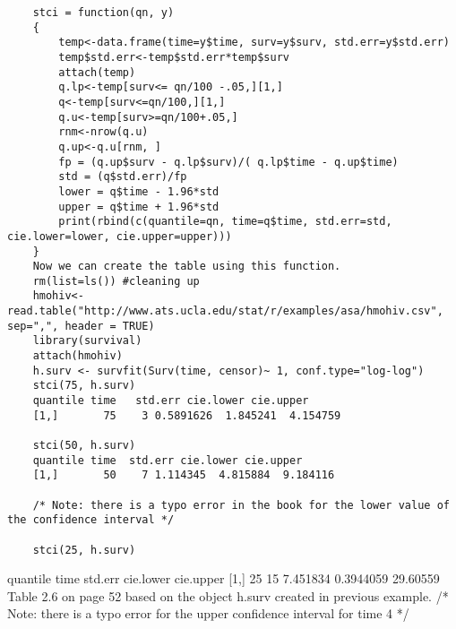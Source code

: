 		\begin{framed}
		\begin{verbatim}
	stci = function(qn, y)
	{
		temp<-data.frame(time=y$time, surv=y$surv, std.err=y$std.err)
		temp$std.err<-temp$std.err*temp$surv 
		attach(temp)
		q.lp<-temp[surv<= qn/100 -.05,][1,]
		q<-temp[surv<=qn/100,][1,]
		q.u<-temp[surv>=qn/100+.05,]
		rnm<-nrow(q.u)
		q.up<-q.u[rnm, ]
		fp = (q.up$surv - q.lp$surv)/( q.lp$time - q.up$time)
		std = (q$std.err)/fp
		lower = q$time - 1.96*std
		upper = q$time + 1.96*std
		print(rbind(c(quantile=qn, time=q$time, std.err=std, cie.lower=lower, cie.upper=upper)))
	}
	Now we can create the table using this function.
	rm(list=ls()) #cleaning up 
	hmohiv<-read.table("http://www.ats.ucla.edu/stat/r/examples/asa/hmohiv.csv", sep=",", header = TRUE) 
	library(survival)
	attach(hmohiv)
	h.surv <- survfit(Surv(time, censor)~ 1, conf.type="log-log")
	stci(75, h.surv)
	quantile time   std.err cie.lower cie.upper
	[1,]       75    3 0.5891626  1.845241  4.154759
	
	stci(50, h.surv)
	quantile time  std.err cie.lower cie.upper
	[1,]       50    7 1.114345  4.815884  9.184116
	
	/* Note: there is a typo error in the book for the lower value of the confidence interval */
	
	stci(25, h.surv)

\end{verbatim}
\end{framed}
	quantile time  std.err cie.lower cie.upper
	[1,]       25   15 7.451834 0.3944059  29.60559
	Table 2.6 on page 52 based on the object h.surv created in previous example.
	/* Note: there is a typo error for the upper confidence interval for time 4  */
	
